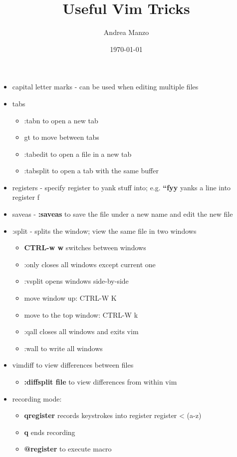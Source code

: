 \documentclass[12pt]{article}
\begin{document}
\title{Useful Vim Tricks}
\author{Andrea Manzo}
\date{\today}
\maketitle

\begin{itemize}
    \item capital letter marks - can be used when editing multiple files
    \item tabs 
        \begin{itemize}
            \item :tabn to open a new tab
            \item gt to move between tabs 
            \item :tabedit to open a file in a new tab
            \item :tabsplit to open a tab with the same buffer
        \end{itemize}
    \item registers - specify register to yank stuff into; e.g. \textbf{``fyy} yanks a line into register f
    \item saveas - \textbf{:saveas }to save the file under a new name and edit the new file
    \item :split - splits the window; view the same file in two windows
        \begin{itemize}
            \item \textbf{CTRL-w w} switches between windows
            \item :only closes all windows except current one
            \item :vsplit opens windows side-by-side
            \item move window up: CTRL-W K
            \item move to the top window: CTRL-W k
            \item :qall closes all windows and exits vim
            \item :wall to write all windows
        \end{itemize}
    \item vimdiff to view differences between files
        \begin{itemize}
            \item \textbf{:diffsplit file} to view differences from within vim
        \end{itemize}
    \item recording mode:
        \begin{itemize}
            \item \textbf{q{register}} records keystrokes into register {register} < (a-z)
            \item \textbf{q} ends recording
            \item \textbf{@{register}} to execute macro
        \end{itemize}
        

\end{itemize}
\end{document}
